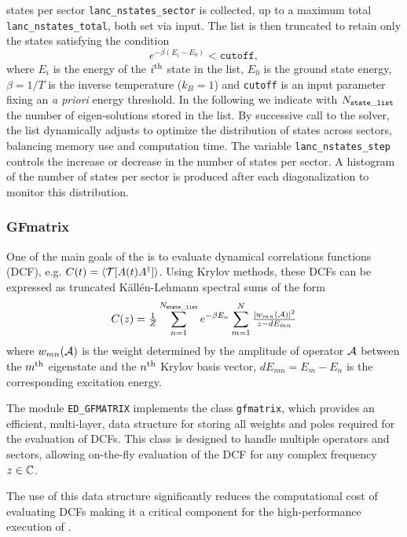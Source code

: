 \documentclass[edipack_sp.tex]{subfiles}
\begin{document}
states per sector  
\texttt{lanc\_nstates\_sector} is collected, up to a
maximum total \texttt{lanc\_nstates\_total}, both set via input.  
The list is then truncated to retain only the states satisfying the condition 
$$
e^{-\beta(E_i-E_0)} < \mathtt{cutoff}, 
$$
where
$E_i$ is the energy of the $i^{\rm th}$ state in the list, $E_0$ is the
ground state energy, $\beta=1/T$ is the inverse temperature ($k_B=1$) and \texttt{cutoff} is an input parameter fixing an {\it a priori} energy threshold.
In the following we indicate with $N_{\tt state\_list}$ the number of eigen-solutions stored in the list. 
By successive call to the \NAME solver, the list dynamically adjusts to optimize the distribution of states 
across sectors, balancing memory use and computation time. The
variable \texttt{lanc\_nstates\_step} controls the increase or
decrease in the number of states per sector. 
A histogram  of the number of states per sector is produced after each diagonalization to monitor this distribution.



\subsubsection{GFmatrix}
One of the main goals of the \NAME is to evaluate dynamical correlations
functions (DCF), e.g. $C(t) = \ibra \TT[ A(t) A^\dagger ]\iket$. Using Krylov methods,
these DCFs can be expressed as truncated K\"all\'en-Lehmann spectral sums of the form
$$
C(z) = \tfrac{1}{Z}\sum_{n=1}^{N_{\tt state\_list}} e^{-\beta E_n} \sum_{m=1}^{N} \tfrac{|w_{mn}(\AA)|^2}{ z
  - dE_{mn}}
$$
where $w_{mn}(\AA)$ is the weight determined by the amplitude of operator $\AA$ between the
$m^{\rm th}$ eigenstate and the $n^{\rm th}$ Krylov basis vector, 
$dE_{mn}=E_m-E_n$ is the corresponding excitation energy.

The module {\tt ED\_GFMATRIX} implements the class {\tt gfmatrix}, 
which provides an efficient, multi-layer, data structure for storing 
all weights and poles required for the evaluation of DCFs. This 
class is designed to handle multiple operators and sectors, allowing 
on-the-fly evaluation of the DCF for any complex frequency 
$z\in\CCC$.

The use of this data structure significantly reduces the computational 
cost of evaluating DCFs making it a critical component 
for the high-performance execution of \NAME.
\end{document}
